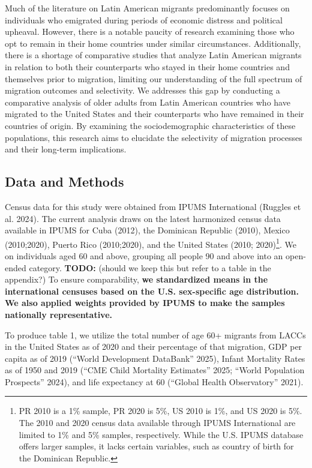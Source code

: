 \documentclass[
]{article}
\begin{document}
Much of the literature on Latin American migrants predominantly focuses
on individuals who emigrated during periods of economic distress and
political upheaval. However, there is a notable paucity of research
examining those who opt to remain in their home countries under similar
circumstances. Additionally, there is a shortage of comparative studies
that analyze Latin American migrants in relation to both their
counterparts who stayed in their home countries and themselves prior to
migration, limiting our understanding of the full spectrum of migration
outcomes and selectivity. We addresses this gap by conducting a
comparative analysis of older adults from Latin American countries who
have migrated to the United States and their counterparts who have
remained in their countries of origin. By examining the sociodemographic
characteristics of these populations, this research aims to elucidate
the selectivity of migration processes and their long-term implications.

\subsection{Data and Methods}\label{sec-methods}

Census data for this study were obtained from IPUMS International
(Ruggles et al. 2024). The current analysis draws on the latest
harmonized census data available in IPUMS for Cuba (2012), the Dominican
Republic (2010), Mexico (2010;2020), Puerto Rico (2010;2020), and the
United States (2010; 2020)\footnote{PR 2010 is a 1\% sample, PR 2020 is
  5\%, US 2010 is 1\%, and US 2020 is 5\%. The 2010 and 2020 census data
  available through IPUMS International are limited to 1\% and 5\%
  samples, respectively. While the U.S. IPUMS database offers larger
  samples, it lacks certain variables, such as country of birth for the
  Dominican Republic.}. We on individuals aged 60 and above, grouping
all people 90 and above into an open-ended category. \textbf{TODO:}
(should we keep this but refer to a table in the appendix?) To ensure
comparability, \textbf{we standardized means in the international
censuses based on the U.S. sex-specific age distribution. We also
applied weights provided by IPUMS to make the samples nationally
representative.}

To produce table 1, we utilize the total number of age 60+ migrants from
LACCs in the United States as of 2020 and their percentage of that
migration, GDP per capita as of 2019 ({``World {Development}
{DataBank}''} 2025), Infant Mortality Rates as of 1950 and 2019
({``{CME} {Child} {Mortality} {Estimates}''} 2025; {``World {Population}
{Prospects}''} 2024), and life expectancy at 60 ({``Global {Health}
{Observatory}''} 2021).
\end{document}
